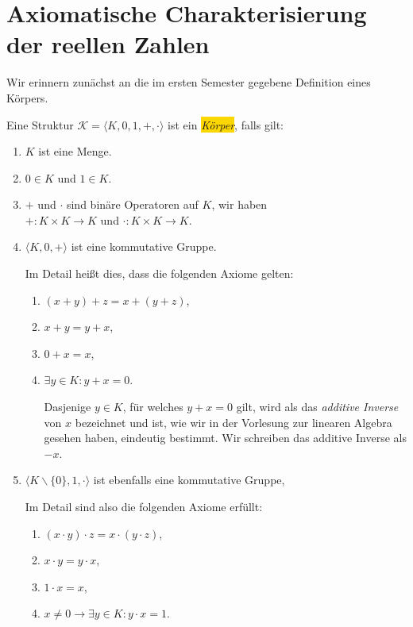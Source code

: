 \section{Axiomatische Charakterisierung der reellen Zahlen}
Wir erinnern zun\"achst an die im ersten Semester gegebene Definition eines K\"orpers. 
\begin{Definition}[K\"orper]
Eine Struktur $\mathcal{K} = \langle K, 0, 1, +, \cdot \rangle$ ist ein \colorbox{gold}{\emph{K\"orper}}, falls gilt:
\begin{enumerate}
\item $K$ ist eine Menge.
\item $0 \in K$ und $1 \in K$.
\item $+$ und $\cdot$ sind bin\"are Operatoren auf $K$, wir haben
      \\[0.2cm]
      \hspace*{1.3cm}
      $+: K \times K \rightarrow K$ \quad und \quad $\cdot: K \times K \rightarrow K$.      
\item $\langle K, 0, + \rangle$ ist eine kommutative Gruppe.
      
      Im Detail hei\ss{}t dies, dass die folgenden Axiome gelten:
      \begin{enumerate}
        \item $(x + y) + z = x + (y + z)$,
        \item $x + y = y + x$,
        \item $0 + x = x$,
        \item $\exists y \in K: y + x = 0$.

              Dasjenige $y \in K$, f\"ur welches $y + x = 0$ gilt, wird als das \emph{additive Inverse} von $x$ 
              bezeichnet und ist, wie wir in der Vorlesung zur linearen Algebra gesehen haben,
              eindeutig bestimmt.  Wir schreiben das additive Inverse als $-x$. 
        \end{enumerate}
\item $\langle K \backslash \{ 0 \}, 1, \cdot \rangle$ ist ebenfalls eine kommutative Gruppe,

      Im Detail sind also die folgenden Axiome erf\"ullt:
      \begin{enumerate}
      \item $(x \cdot y) \cdot z = x \cdot (y \cdot z)$,
      \item $x \cdot y = y \cdot x$,
      \item $1 \cdot x = x$,
      \item $x \not= 0 \rightarrow \exists y \in K: y \cdot x = 1$.


\end{enumerate}
\end{enumerate}
\end{Definition}
